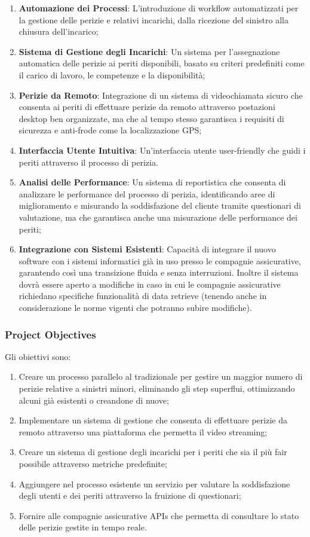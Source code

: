 \documentclass[a4paper,12pt, openright]{report}
\begin{document}
\begin{enumerate}
    \item \textbf{Automazione dei Processi}: L'introduzione di workflow automatizzati per la gestione delle perizie e relativi incarichi, dalla ricezione del sinistro alla chiusura dell'incarico;
    \item \textbf{Sistema di Gestione degli Incarichi}: Un sistema per l'assegnazione automatica delle perizie ai periti disponibili, basato su criteri predefiniti come il carico di lavoro, le competenze e la disponibilità;
    \item \textbf{Perizie da Remoto}: Integrazione di un sistema di videochiamata sicuro che consenta ai periti di effettuare perizie da remoto attraverso postazioni desktop ben organizzate, ma che al tempo stesso garantisca i requisiti di sicurezza e anti-frode come la localizzazione GPS;
    \item \textbf{Interfaccia Utente Intuitiva}: Un'interfaccia utente user-friendly che guidi i periti attraverso il processo di perizia.
    \item \textbf{Analisi delle Performance}: Un sistema di reportistica che consenta di analizzare le performance del processo di perizia, identificando aree di miglioramento e misurando la soddisfazione del cliente tramite questionari di valutazione, ma che garantisca anche una misurazione delle performance dei periti;
    \item \textbf{Integrazione con Sistemi Esistenti}: Capacità di integrare il nuovo software con i sistemi informatici già in uso presso le compagnie assicurative, garantendo così una transizione fluida e senza interruzioni. Inoltre il sistema dovrà essere aperto a modifiche in caso in cui le compagnie assicurative richiedano specifiche funzionalità di data retrieve (tenendo anche in considerazione le norme vigenti che potranno subire modifiche).
\end{enumerate}

\subsubsection{Project Objectives}
Gli obiettivi sono:
\begin{enumerate}
    \item Creare un processo parallelo al tradizionale per gestire un maggior numero di perizie relative a sinistri minori, eliminando gli step superflui, ottimizzando alcuni già esistenti o creandone di nuove;
    \item Implementare un sistema di gestione che consenta di effettuare perizie da remoto attraverso una piattaforma che permetta il video streaming;
    \item Creare un sistema di gestione degli incarichi per i periti che sia il più fair possibile attraverso metriche predefinite;
    \item Aggiungere nel processo esistente un servizio per valutare la soddisfazione degli utenti e dei periti attraverso la fruizione di questionari;
    \item Fornire alle compagnie assicurative APIs che permetta di consultare lo stato delle perizie gestite in tempo reale.
\end{enumerate}
\end{document}
